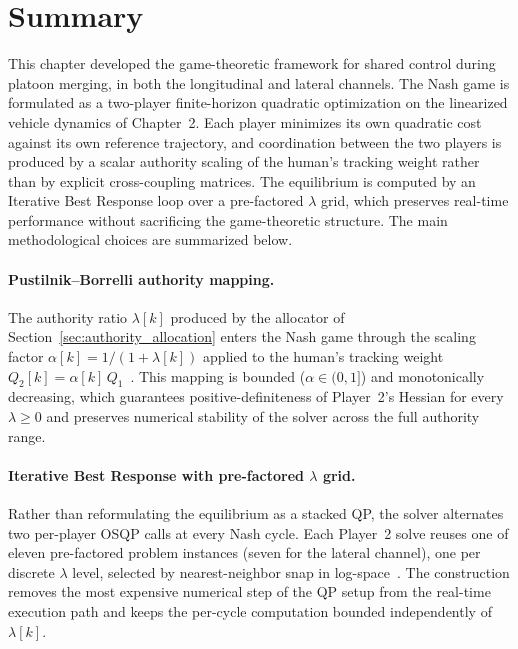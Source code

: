 \documentclass[12pt,a4paper,oneside]{report}
\begin{document}
\section{Summary}
\label{sec:ch4_summary}

This chapter developed the game-theoretic framework for shared control during platoon merging, in both the longitudinal and lateral channels. The Nash game is formulated as a two-player finite-horizon quadratic optimization on the linearized vehicle dynamics of Chapter~2. Each player minimizes its own quadratic cost against its own reference trajectory, and coordination between the two players is produced by a scalar authority scaling of the human's tracking weight rather than by explicit cross-coupling matrices. The equilibrium is computed by an Iterative Best Response loop over a pre-factored $\lambda$ grid, which preserves real-time performance without sacrificing the game-theoretic structure. The main methodological choices are summarized below.

\paragraph{Pustilnik--Borrelli authority mapping.} The authority ratio $\lambda[k]$ produced by the allocator of Section~\ref{sec:authority_allocation} enters the Nash game through the scaling factor $\alpha[k] = 1/(1 + \lambda[k])$ applied to the human's tracking weight $Q_2[k] = \alpha[k] \, Q_1$~\cite{pustilnikGeneralizedNashEquilibrium2025}. This mapping is bounded ($\alpha \in (0, 1]$) and monotonically decreasing, which guarantees positive-definiteness of Player~2's Hessian for every $\lambda \geq 0$ and preserves numerical stability of the solver across the full authority range.

\paragraph{Iterative Best Response with pre-factored $\lambda$ grid.} Rather than reformulating the equilibrium as a stacked QP, the solver alternates two per-player OSQP calls at every Nash cycle. Each Player~2 solve reuses one of eleven pre-factored problem instances (seven for the lateral channel), one per discrete $\lambda$ level, selected by nearest-neighbor snap in log-space~\cite{pustilnikGeneralizedNashEquilibrium2025}. The construction removes the most expensive numerical step of the QP setup from the real-time execution path and keeps the per-cycle computation bounded independently of $\lambda[k]$.
\end{document}
